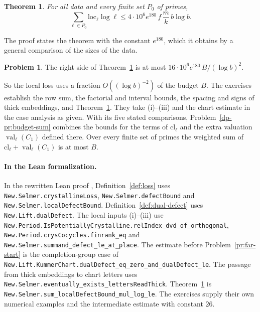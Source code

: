 \documentclass[reqno]{amsart}
\theoremstyle{definition}
\newtheorem{problem}{Problem}[section]
\theoremstyle{plain}
\newtheorem{theorem}{Theorem}[section]
\newcommand{\val}{\operatorname{val}}
\newcommand{\loc}{\mathrm{loc}}
\newcommand{\cl}{\mathrm{cl}}
\begin{document}
\begin{theorem}\label{thm:local-loss}
For all data and every finite set \(P_0\) of primes,
\[
  \sum_{\ell \in P_0}\loc_\ell\log\ell \le 4\cdot10^6 e^{180}\, f\,\frac mk\, b\log b .
\]
\end{theorem}

The proof states the theorem with the constant \(e^{180}\), which it obtains by a general comparison of the sizes of the data.

\begin{problem}\label{pr:vs-budget}
The right side of Theorem~\ref{thm:local-loss} is at most \(16\cdot10^6 e^{180}\,B/(\log b)^2\).
\end{problem}

So the local loss uses a fraction \(O((\log b)^{-2})\) of the budget \(B\).  The exercises establish the row sum, the factorial and interval bounds, the spacing and signs of thick embeddings, and Theorem~\ref{thm:local-loss}.  They take (i)--(iii) and the chart estimate in the case analysis as given.  With its five stated comparisons, Problem~\ref{dp-pr:budget-sum} combines the bounds for the terms of \(\cl_\ell\) and the extra valuation \(\val_\ell(C_1)\) defined there.  Over every finite set of primes the weighted sum of \(\cl_\ell+\val_\ell(C_1)\) is at most \(B\).

\paragraph{In the Lean formalization.}
\begin{sloppypar}
In the rewritten Lean proof \cite{GL}, Definition~\ref{def:loss} uses \texttt{New.Selmer.crystallineLoss}, \texttt{New.Selmer.defectBound} and \texttt{New.Selmer.localDefectBound}.  Definition~\ref{def:dual-defect} uses \texttt{New.Lift.dualDefect}.  The local inputs (i)--(iii) use \texttt{New.Period.IsPotentiallyCrystalline.relIndex\_dvd\_of\_orthogonal}, \texttt{New.Period.crysCocycles.finrank\_eq} and \texttt{New.Selmer.summand\_defect\_le\_at\_place}.  The estimate before Problem~\ref{pr:far-start} is the completion-group case of \texttt{New.Lift.KummerChart.dualDefect\_eq\_zero\_and\_dualDefect\_le}.  The passage from thick embeddings to chart letters uses \texttt{New.Selmer.eventually\_exists\_lettersReadThick}.  Theorem~\ref{thm:local-loss} is \texttt{New.Selmer.sum\_localDefectBound\_mul\_log\_le}.  The exercises supply their own numerical examples and the intermediate estimate with constant \(26\).
\end{sloppypar}
\end{document}
